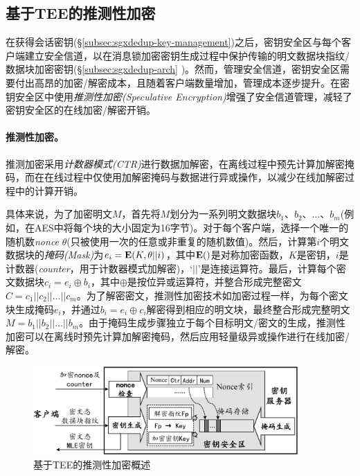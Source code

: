\subsection{基于TEE的推测性加密}
\label{subsec:sgxdedup-encryption}

在获得会话密钥(\S\ref{subsec:sgxdedup-key-management})之后，密钥安全区与每个客户端建立安全信道，以在消息锁加密密钥生成过程中保护传输的明文数据块指纹/数据块加密密钥(\S\ref{subsec:sgxdedup-arch} )。然而，管理安全信道，密钥安全区需要付出高昂的加密/解密成本，且随着客户端数量增加，管理成本逐步提升。\sysnameS 在密钥安全区中使用\textit{推测性加密(Speculative Encryption)}\cite{eduardo2019Speculative}增强了安全信道管理，减轻了密钥安全区的在线加密/解密开销。

\paragraph*{推测性加密。}推测加密\cite{eduardo2019Speculative}采用\textit{计数器模式(CTR)}\cite{counter}进行数据加解密，在离线过程中预先计算加解密掩码，而在在线过程中仅使用加解密掩码与数据进行异或操作，以减少在线加解密过程中的计算开销。

具体来说，为了加密明文$M$，首先将$M$划分为一系列明文数据块$b_1、b_2、\ldots、b_m$(例如，在AES中将每个块的大小固定为16字节)。对于每个客户端，选择一个唯一的随机数\textit{nonce} $\theta$(只被使用一次的任意或非重复的随机数值)。然后，计算第$i$个明文数据块的\textit{掩码(Mask)}为$e_i = {\bf E}(K, \theta || i)$，其中${\bf E}()$是对称加密函数，$K$是密钥，$i$是计数器(\textit{counter}，用于计数器模式加解密)，‘$||$’是连接运算符。最后，计算每个密文数据块$c_i = e_i \oplus b_i $，其中$\oplus$是按位异或运算符，并整合形成完整密文$C = c_1 || c_2 || \ldots || c_m$。为了解密密文，推测性加密技术如加密过程一样，为每个密文块生成掩码$e_i$，并通过$b_i = e_i \oplus c_i $解密得到相应的明文块，最终整合形成完整明文$M = b_1 || b_2 || \ldots || b_m$。由于掩码生成步骤独立于每个目标明文/密文的生成，推测性加密可以在离线时预先计算加解密掩码，然后应用轻量级异或操作进行在线加密/解密。

\begin{figure}[!htb]
    \centering
    \includegraphics[width=0.9\textwidth]{pic/sgxdedup/key-enclave-arch.pdf}
    \caption{基于TEE的推测性加密概述}
    \label{fig:sgxdedup-SpecEnc}
\end{figure}

